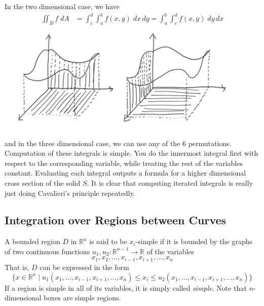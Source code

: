   In the two dimensional case, we have
  \begin{align*}
      \iint_B f \; d A & = \int_c^d \int_a^b f(x, y) \; d x \, d y = \int_a^b \int_c^d f(x, y) \; d y \, d x 
  \end{align*}
  \begin{center}
      \includegraphics[scale=0.27]{img/Fubini_Theorem.PNG}
  \end{center}
  and in the three dimensional case, we can use any of the 6 permutations. Computation of these integrals is simple. You do the innermost integral first with respect to the corresponding variable, while treating the rest of the variables constant. Evaluating each integral outputs a formula for a higher dimensional cross section of the solid $S$. It is clear that computing iterated integrals is really just doing Cavalieri's principle repeatedly. 

\subsection{Integration over Regions between Curves} 

  \begin{definition}
    A bounded region $D$ in $\mathbb{R}^n$ is said to be $x_i$-simple if it is bounded by the graphs of two continuous functions $u_1, u_2: \mathbb{R}^{n-1} \longrightarrow \mathbb{R}$ of the variables 
    \[x_1, x_2, ..., x_{i-1}, x_{i+1}, ..., x_n\]
    That is, $D$ can be expressed in the form 
    \[\{ x \in \mathbb{R}^n \; | \; u_1 (x_1,..., x_{i-1}, x_{i+1}, ... , x_n) \leq x_i \leq u_2 (x_1, ..., x_{i-1}, x_{i+1}, ..., x_n)\}\]
    If a region is simple in all of its variables, it is simply called \textit{simple}. Note that $n$-dimensional boxes are simple regions. 
  \end{definition}

